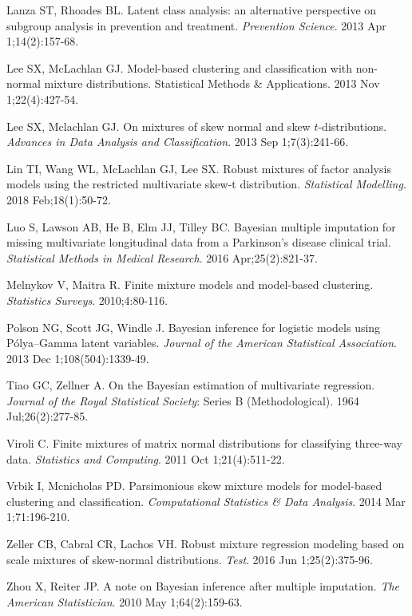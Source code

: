 \documentclass[useAMS,referee]{biom}
\begin{document}
\begin{thebibliography}{}
\bibitem{ } Lanza ST, Rhoades BL. Latent class analysis: an alternative perspective on subgroup analysis in prevention and treatment. \textit{Prevention Science}. 2013 Apr 1;14(2):157-68.

\bibitem{ } Lee SX, McLachlan GJ. Model-based clustering and classification with non-normal mixture distributions. Statistical Methods \& Applications. 2013 Nov 1;22(4):427-54.

\bibitem{ } Lee SX, Mclachlan GJ. On mixtures of skew normal and skew $t$-distributions. \textit{Advances in Data Analysis and Classification}. 2013 Sep 1;7(3):241-66.

\bibitem{ } Lin TI, Wang WL, McLachlan GJ, Lee SX. Robust mixtures of factor analysis models using the restricted multivariate skew-t distribution. \textit{Statistical Modelling}. 2018 Feb;18(1):50-72.

\bibitem{ } Luo S, Lawson AB, He B, Elm JJ, Tilley BC. Bayesian multiple imputation for missing multivariate longitudinal data from a Parkinson's disease clinical trial. \textit{Statistical Methods in Medical Research}. 2016 Apr;25(2):821-37.

\bibitem{ } Melnykov V, Maitra R. Finite mixture models and model-based clustering. \textit{Statistics Surveys}. 2010;4:80-116.

\bibitem{ } Polson NG, Scott JG, Windle J. Bayesian inference for logistic models using P\'olya--Gamma latent variables. \textit{Journal of the American Statistical Association}. 2013 Dec 1;108(504):1339-49.

\bibitem{ } Tiao GC, Zellner A. On the Bayesian estimation of multivariate regression. \textit{Journal of the Royal Statistical Society}: Series B (Methodological). 1964 Jul;26(2):277-85.

\bibitem{ } Viroli C. Finite mixtures of matrix normal distributions for classifying three-way data. \textit{Statistics and Computing}. 2011 Oct 1;21(4):511-22.

\bibitem{ } Vrbik I, Mcnicholas PD. Parsimonious skew mixture models for model-based clustering and classification. \textit{Computational Statistics \& Data Analysis}. 2014 Mar 1;71:196-210.

\bibitem{ } Zeller CB, Cabral CR, Lachos VH. Robust mixture regression modeling based on scale mixtures of skew-normal distributions. \textit{Test}. 2016 Jun 1;25(2):375-96.

\bibitem{ } Zhou X, Reiter JP. A note on Bayesian inference after multiple imputation. \textit{The American Statistician}. 2010 May 1;64(2):159-63.

\end{thebibliography}




\label{lastpage}
\end{document}
